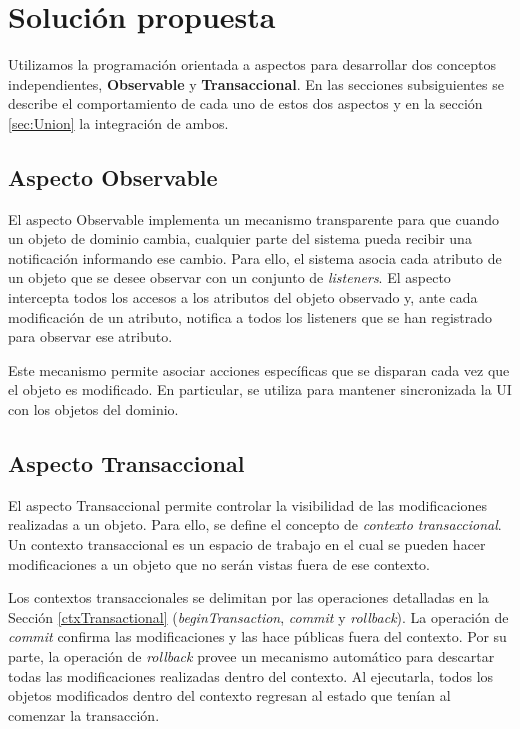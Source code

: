 \section{Solución propuesta}
\label{sec:Solucion}

	Utilizamos la programación orientada a aspectos para desarrollar dos
	conceptos independientes, {\bf Observable} y  {\bf Transaccional}.
	En las secciones subsiguientes se describe el comportamiento de cada uno de
	estos dos aspectos y en la sección \ref{sec:Union} la integración de ambos.

	\subsection{Aspecto Observable}
	\label{aspectoObservable}
		El aspecto Observable implementa un mecanismo transparente para que cuando un
		objeto de dominio cambia, cualquier parte del sistema pueda recibir una
		notificación informando ese cambio.
		Para ello, el sistema asocia cada atributo de un objeto que se desee observar
		con un conjunto de \emph{listeners}. 
		El aspecto intercepta todos los accesos a los atributos
		del objeto observado y, ante cada modificación de un atributo, notifica a todos
		los listeners que se han registrado para observar ese atributo.
		
		Este mecanismo permite asociar acciones específicas que se disparan cada vez
		que el objeto es modificado. En particular, se utiliza para mantener
		sincronizada la UI con los objetos del dominio.

	\subsection{Aspecto Transaccional}
	\label{aspectoTransaccional}
		El aspecto Transaccional permite controlar la visibilidad de las modificaciones
		realizadas a un objeto.
		Para ello, se define el concepto de \emph{contexto transaccional}.
		Un contexto transaccional es un espacio de trabajo en el cual se pueden
		hacer modificaciones a un objeto que no serán vistas fuera de ese contexto.
	
		Los contextos transaccionales se delimitan por las
		operaciones detalladas en la Sección \ref{ctxTransactional}
		(\emph{beginTransaction}, \emph{commit} y \emph{rollback}).
		La operación de \emph{commit} confirma las modificaciones y las hace públicas
		fuera del contexto.
		Por su parte, la operación de \emph{rollback} provee un
		mecanismo automático para descartar todas las modificaciones realizadas
		dentro del contexto.
		Al ejecutarla, todos los objetos modificados dentro del contexto regresan al
		estado que tenían al comenzar la transacción.
		 
